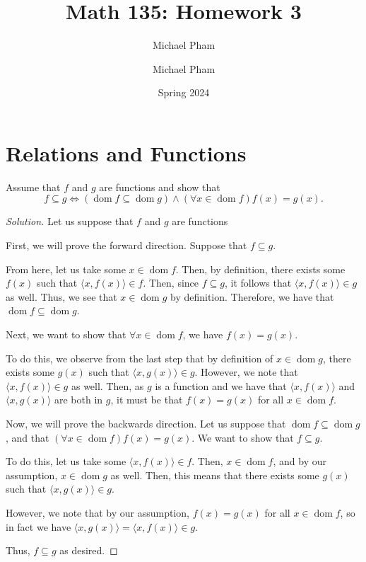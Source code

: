 \documentclass{article}
\title{#1}
\author{Michael Pham}
\date{#2}
\newenvironment{solution}{\begin{proof}[Solution]}{\end{proof}}
\renewcommand\qedsymbol{$\blacksquare$}
\newenvironment{innerproof}{\renewcommand{\qedsymbol}{$\square$}\proof}{\endproof}
\DeclareMathOperator*{\dom}{\mathrm{dom}}
\newcommand{\pr}[1]{\left( {#1} \right)}
\newcommand{\ang}[1]{\langle {#1} \rangle}
\newcommand{\mytitle}[2]{%
	\title{#1}
	\author{Michael Pham}
	\date{#2}
	\maketitle
	\newpage
	\listoftheorems
	\newpage
}
\begin{document}
	\mytitle{Math 135: Homework 3}{Spring 2024}
	
	\setcounter{section}{2}
	\section{Relations and Functions}
	\begin{hw}{12}
		Assume that $f$ and $g$ are functions and show that
		\begin{equation*}
			f \subseteq g \iff \pr{\dom f \subseteq \dom g} \land \pr{\forall x \in \dom f}f(x) = g(x).
		\end{equation*}
	\end{hw}
	\begin{solution}
		Let us suppose that $f$ and $g$ are functions
		
		First, we will prove the forward direction.
		\begin{innerproof}
			Suppose that $f \subseteq g$.
			
			From here, let us take some $x \in \dom f$. Then, by definition, there exists some $f(x)$ such that $\ang{x, f(x)} \in f$. Then, since $f \subseteq g$, it follows that $\ang{x, f(x)} \in g$ as well. Thus, we see that $x \in \dom g$ by definition. Therefore, we have that $\dom f \subseteq \dom g$.
			
			Next, we want to show that $\forall x \in \dom f$, we have $f(x) = g(x)$.
			
			To do this, we observe from the last step that by definition of $x \in \dom g$, there exists some $g(x)$ such that $\ang{x, g(x)} \in g$. However, we note that $\ang{x, f(x)} \in g$ as well. Then, as $g$ is a function and we have that $\ang{x, f(x)}$ and $\ang{x, g(x)}$ are both in $g$, it must be that $f(x) = g(x)$ for all $x \in \dom f$.
		\end{innerproof}
	
		Now, we will prove the backwards direction.
		\begin{innerproof}
			Let us suppose that $\dom f \subseteq \dom g$, and that $(\forall x \in \dom f) f(x) = g(x)$. We want to show that $f \subseteq g$.
			
			To do this, let us take some $\ang{x, f(x)} \in f$. Then, $x \in \dom f$, and by our assumption, $x \in \dom g$ as well. Then, this means that there exists some $g(x)$ such that $\ang{x, g(x)} \in g$.
			
			However, we note that by our assumption, $f(x) = g(x)$ for all $x \in \dom f$, so in fact we have $\ang{x, g(x)} = \ang{x, f(x)} \in g$.
			
			Thus, $f \subseteq g$ as desired.
		\end{innerproof}
	\end{solution}
\end{document}
